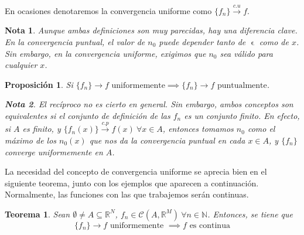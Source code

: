 \documentclass[11pt, a4paper]{article}
\let\epsilon\upvarepsilon
\newcommand{\R}{\mathbb{R}}
\newcommand{\N}{\mathbb{N}}
\newcommand{\fn}{\{f_n\}}
\theoremstyle{theorem-style}
\newtheorem{nth}{Teorema}[section]
\newtheorem*{nprop}{Proposición}
\theoremstyle{definition-style}
\theoremstyle{remark-style}
\newtheorem*{nota}{Nota}
\theoremstyle{example-style}
\begin{document}
En ocasiones denotaremos la convergencia uniforme como $\fn \xrightarrow {c.u} f$.

\begin{nota}
Aunque ambas definiciones son muy parecidas, hay una diferencia clave. En la convergencia puntual, el valor de $n_0$ puede depender tanto de $\epsilon$ como de $x$. Sin embargo, en la convergencia uniforme, exigimos que $n_0$ sea válido para cualquier $x$.
\end{nota}
 
\begin{nprop}
	Si $\fn\to f \text{ uniformemente} \implies \fn \to f \text{ puntualmente}$. 
	\begin{nota}
	El recíproco no es cierto en general. Sin embargo, ambos conceptos son equivalentes si el conjunto de definición de las $f_n$ es un conjunto finito. En efecto, si $A$ es finito, y $\{f_n(x)\} \xrightarrow {c.p} f(x) \ \forall x \in A$, entonces tomamos $n_0$ como el máximo de los $n_0(x)$ que nos da la convergencia puntual en cada $x \in A$, y $\fn$ converge uniformemente en $A$.  
\end{nota}
\end{nprop}

La necesidad del concepto de convergencia uniforme se aprecia bien en el siguiente teorema, junto con los ejemplos que aparecen a continuación. Normalmente, las funciones con las que trabajemos serán continuas.

\begin{nth}
	Sean $\emptyset \ne A \subseteq \R^N$, $f_n \in \mathcal{C}(A,\R^M)\ \forall n\in \N$. Entonces, se tiene que
	\[
	\fn \to f \text{ uniformemente } \implies f \text{ es continua}
	\]
\end{nth}
\end{document}
